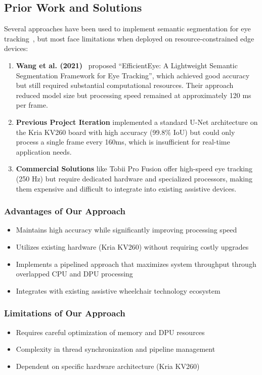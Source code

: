 \subsection{Prior Work and Solutions}\label{subsec:prior-work}

Several approaches have been used to implement semantic segmentation for eye tracking~\cite{garcia2017review}, but most face limitations when deployed on resource-constrained edge devices:

\begin{enumerate}
\item \textbf{Wang et al. (2021)}~\cite{wang2021} proposed ``EfficientEye: A Lightweight Semantic Segmentation Framework for Eye Tracking'', which achieved good accuracy but still required substantial computational resources. Their approach reduced model size but processing speed remained at approximately 120 ms per frame.

\item \textbf{Previous Project Iteration} implemented a standard U-Net architecture on the Kria KV260 board with high accuracy (99.8\% IoU) but could only process a single frame every 160ms, which is insufficient for real-time application needs.

\item \textbf{Commercial Solutions} like Tobii Pro Fusion offer high-speed eye tracking (250 Hz) but require dedicated hardware and specialized processors, making them expensive and difficult to integrate into existing assistive devices.
\end{enumerate}

\subsubsection{Advantages of Our Approach}
\begin{itemize}
\item Maintains high accuracy while significantly improving processing speed
\item Utilizes existing hardware (Kria KV260) without requiring costly upgrades
\item Implements a pipelined approach that maximizes system throughput through overlapped CPU and DPU processing
\item Integrates with existing assistive wheelchair technology ecosystem
\end{itemize}

\subsubsection{Limitations of Our Approach}
\begin{itemize}
\item Requires careful optimization of memory and DPU resources
\item Complexity in thread synchronization and pipeline management
\item Dependent on specific hardware architecture (Kria KV260)
\end{itemize}

